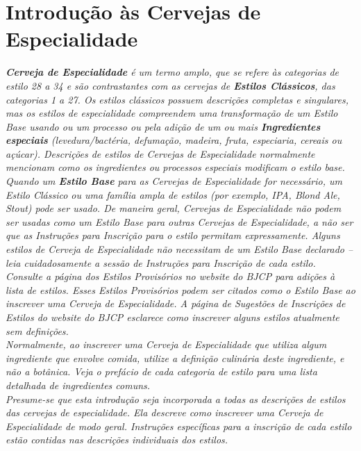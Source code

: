 \section*{Introdução às Cervejas de Especialidade}
\textit{\textbf{Cerveja de Especialidade} é um termo amplo, que se refere às categorias de estilo 28 a 34 e são contrastantes com as cervejas de \textbf{Estilos Clássicos}, das categorias 1 a 27. Os estilos clássicos possuem descrições completas e singulares, mas os estilos de especialidade compreendem uma transformação de um Estilo Base usando ou um processo ou pela adição de um ou mais \textbf{Ingredientes especiais} (levedura/bactéria, defumação, madeira, fruta, especiaria, cereais ou açúcar). Descrições de estilos de Cervejas de Especialidade normalmente mencionam como os ingredientes ou processos especiais modificam o estilo base.}\\
\textit{Quando um \textbf{Estilo Base} para as Cervejas de Especialidade for necessário, um Estilo Clássico ou uma família ampla de estilos (por exemplo, IPA, Blond Ale, Stout) pode ser usado. De maneira geral, Cervejas de Especialidade não podem ser usadas como um Estilo Base para outras Cervejas de Especialidade, a não ser que as Instruções para Inscrição para o estilo permitam expressamente. Alguns estilos de Cerveja de Especialidade não necessitam de um Estilo Base declarado – leia cuidadosamente a sessão de Instruções para Inscrição de cada estilo.}\\
\textit{Consulte a página dos Estilos Provisórios no website do BJCP para adições à lista de estilos. Esses Estilos Provisórios podem ser citados como o Estilo Base ao inscrever uma Cerveja de Especialidade. A página de Sugestões de Inscrições de Estilos do website do BJCP esclarece como inscrever alguns estilos atualmente sem definições.}\\
\textit{Normalmente, ao inscrever uma Cerveja de Especialidade que utiliza algum ingrediente que envolve comida, utilize a definição culinária deste ingrediente, e não a botânica. Veja o prefácio de cada categoria de estilo para uma lista detalhada de ingredientes comuns. }\\
\textit{Presume-se que esta introdução seja incorporada a todas as descrições de estilos das cervejas de especialidade. Ela descreve como inscrever uma Cerveja de Especialidade de modo geral. Instruções específicas para a inscrição de cada estilo estão contidas nas descrições individuais dos estilos.}\\
